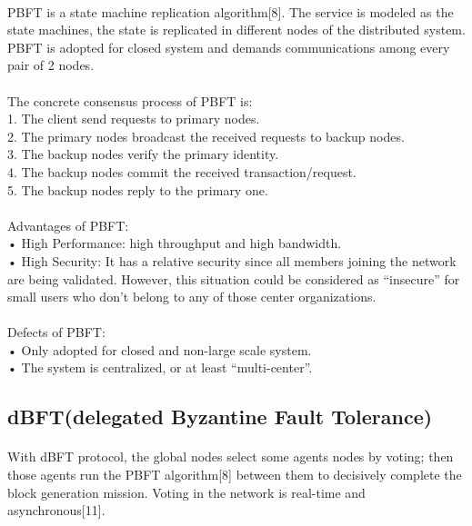 \documentclass[]{article}
\begin{document}
\begin{CJK*}{UTF8}{gbsn}
	\paragraph{} 
	PBFT is a state machine replication algorithm[8]. The service is modeled as the state machines, the state is replicated in different nodes of the distributed system. PBFT is adopted for closed system and demands communications among every pair of 2 nodes.
	\paragraph{} 
	The concrete consensus process of PBFT is:
\\1. The client send requests to primary nodes.
\\2. The primary nodes broadcast the received requests to backup nodes.
\\3. The backup nodes verify the primary identity.
\\4. The backup nodes commit the received transaction/request.
\\5. The backup nodes reply to the primary one.
	
\paragraph{} 
Advantages of PBFT:
\\• High Performance: high throughput and high bandwidth.
\\• High Security: It has a relative security since all members joining the network are being validated. However, this situation could be considered as ``insecure'' for small users who don't belong to any of those center organizations.
	\paragraph{} 
Defects of PBFT:	
\\• Only adopted for closed and non-large scale system.
\\• The system is centralized, or at least ``multi-center''.
	
	\subsection{dBFT(delegated Byzantine Fault Tolerance)}
	\paragraph{} 
	With dBFT protocol, the global nodes select some agents nodes by voting; then those agents run the PBFT algorithm[8] between them to decisively complete the block generation mission. Voting in the network is real-time and asynchronous[11].
	

\end{CJK*}
\end{document}
